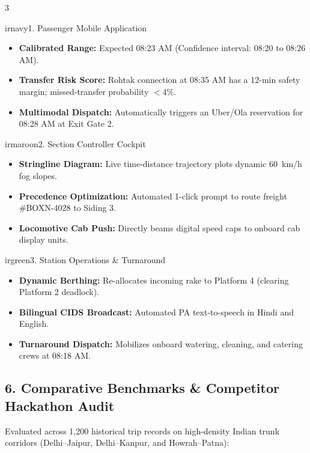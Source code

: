 \documentclass[10pt, a4paper]{article}
\begin{document}
\begin{multicols}{3}
\begin{actioncard}{irnavy}{1. Passenger Mobile Application}
\begin{itemize}[leftmargin=3mm, itemsep=1.5pt]
  \item \textbf{Calibrated Range:} Expected 08:23 AM (Confidence interval: 08:20 to 08:26 AM).
  \item \textbf{Transfer Risk Score:} Rohtak connection at 08:35 AM has a 12-min safety margin; missed-transfer probability $< 4\%$.
  \item \textbf{Multimodal Dispatch:} Automatically triggers an Uber/Ola reservation for 08:28 AM at Exit Gate 2.
\end{itemize}
\end{actioncard}

\columnbreak

\begin{actioncard}{irmaroon}{2. Section Controller Cockpit}
\begin{itemize}[leftmargin=3mm, itemsep=1.5pt]
  \item \textbf{Stringline Diagram:} Live time-distance trajectory plots dynamic 60~km/h fog slopes.
  \item \textbf{Precedence Optimization:} Automated 1-click prompt to route freight \#BOXN-4028 to Siding 3.
  \item \textbf{Locomotive Cab Push:} Directly beams digital speed caps to onboard cab display units.
\end{itemize}
\end{actioncard}

\columnbreak

\begin{actioncard}{irgreen}{3. Station Operations \& Turnaround}
\begin{itemize}[leftmargin=3mm, itemsep=1.5pt]
  \item \textbf{Dynamic Berthing:} Re-allocates incoming rake to Platform 4 (clearing Platform 2 deadlock).
  \item \textbf{Bilingual CIDS Broadcast:} Automated PA text-to-speech in Hindi and English.
  \item \textbf{Turnaround Dispatch:} Mobilizes onboard watering, cleaning, and catering crews at 08:18 AM.
\end{itemize}
\end{actioncard}
\end{multicols}

\subsection*{6. Comparative Benchmarks \& Competitor Hackathon Audit}
Evaluated across 1,200 historical trip records on high-density Indian trunk corridors (Delhi--Jaipur, Delhi--Kanpur, and Howrah--Patna):
\end{document}
